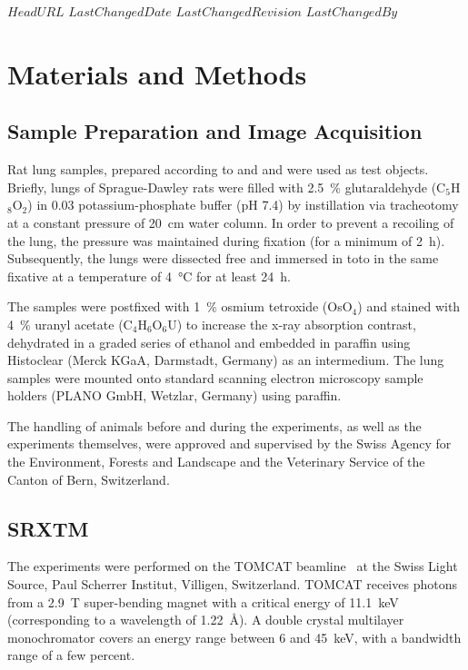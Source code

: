 \svnidlong
{$HeadURL$}
{$LastChangedDate$}
{$LastChangedRevision$}
{$LastChangedBy$}
%
\section{Materials and Methods}%
\label{sec:materials and methods}%
\subsection{Sample Preparation and Image Acquisition}%
Rat lung samples, prepared according to %
\ifhtml
	\citet{Tschanz2002} and \citet{Luyet2002}
\else
	 and 
\fi%
were used as test objects. Briefly, lungs of Sprague-Dawley rats were filled with \SI{2.5}{\percent} glutaraldehyde (C$_5$H$_8$O$_2$) in \SI{0.03}{\Molar} potassium-phosphate buffer (pH 7.4) by instillation via tracheotomy at a constant pressure of \SI{20}{\centi\meter} water column. In order to prevent a recoiling of the lung, the pressure was maintained during fixation (for a minimum of \SI{2}{\hour}). Subsequently, the lungs were dissected free and immersed in toto in the same fixative at a temperature of \SI{4}{\celsius} for at least \SI{24}{\hour}.

The samples were postfixed with \SI{1}{\percent} osmium tetroxide (OsO$_4$) and stained with \SI{4}{\percent} uranyl acetate (C$_4$H$_6$O$_6$U) to increase the x-ray absorption contrast, dehydrated in a graded series of ethanol and embedded in paraffin using Histoclear (Merck KGaA, Darmstadt, Germany) as an intermedium. The lung samples were mounted onto standard scanning electron microscopy sample holders (PLANO GmbH, Wetzlar, Germany) using paraffin.

The handling of animals before and during the experiments, as well as the experiments themselves, were approved and supervised by the Swiss Agency for the Environment, Forests and Landscape and the Veterinary Service of the Canton of Bern, Switzerland.

\subsection{SRXTM}%
The experiments were performed on the TOMCAT beamline~\cite{Stampanoni2006a} at the Swiss Light Source, Paul Scherrer Institut, Villigen, Switzerland. TOMCAT receives photons from a \SI{2.9}{\tesla} super-bending magnet with a critical energy of \SI{11.1}{\kilo\electronvolt} (corresponding to a wavelength of \SI{1.22}{\angstrom}). A double crystal multilayer monochromator covers an energy range between 6 and \SI{45}{\kilo\electronvolt}, with a bandwidth range of a few percent.

